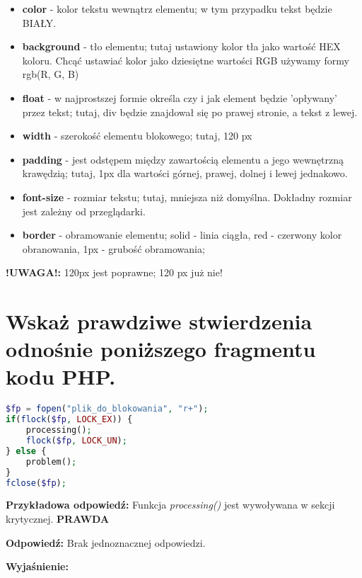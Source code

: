 \begin{itemize}
\item
\textbf{color} - kolor tekstu wewnątrz elementu; w tym przypadku tekst będzie BIAŁY.
\item
\textbf{background} - tło elementu; tutaj ustawiony kolor tła jako wartość HEX koloru. Chcąć ustawiać kolor jako dziesiętne wartości RGB używamy formy rgb(R, G, B)
\item
\textbf{float} - w najprostszej formie określa czy i jak element będzie 'opływany' przez tekst; tutaj, div będzie znajdował się po prawej stronie, a tekst z lewej.
\item
\textbf{width} - szerokość elementu blokowego; tutaj, 120 px
\item
\textbf{padding} - jest odstępem między zawartością elementu a jego wewnętrzną krawędzią; tutaj, 1px dla wartości górnej, prawej, dolnej i lewej jednakowo.
\item
\textbf{font-size} - rozmiar tekstu; tutaj, mniejsza niż domyślna. Dokładny rozmiar jest zależny od przeglądarki.
\item
\textbf{border} - obramowanie elementu; solid - linia ciągła, red - czerwony kolor obranowania, 1px - grubość obramowania;
\end{itemize}

\textbf{!UWAGA!: }120px jest poprawne; 120 px już nie!


\section{Wskaż prawdziwe stwierdzenia odnośnie poniższego fragmentu kodu PHP.}
\begin{lstlisting}[language=php]
$fp = fopen("plik_do_blokowania", "r+");
if(flock($fp, LOCK_EX)) {
	processing();
	flock($fp, LOCK_UN);
} else {
	problem();
}
fclose($fp);
\end{lstlisting}

\noindent
{\textbf{Przykładowa odpowiedź:}}
Funkcja \textit{processing()} jest wywoływana w sekcji krytycznej.
\textbf{PRAWDA}

\vspace{0.4cm}
\noindent
\textbf{Odpowiedź:}
Brak jednoznacznej odpowiedzi.

\vspace{0.4cm}
\noindent
\textbf{Wyjaśnienie:}


